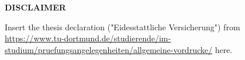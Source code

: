 %
\clearpage
\thispagestyle{empty}

\begin{center}
\begin{tcolorbox}[
  colback=red!10,
  colframe=red!80!black,
  width=\textwidth,
  height=\textheight,
  valign=center,
  halign=center,
  boxrule=2pt,
]
{\Huge\bfseries DISCLAIMER}

\vspace{1cm}

{\Large
Insert the thesis declaration ("Eidesstattliche Versicherung") from \url{https://www.tu-dortmund.de/studierende/im-studium/pruefungsangelegenheiten/allgemeine-vordrucke/} here.
}
\end{tcolorbox}
\end{center}

\clearpage


